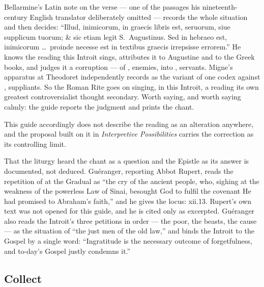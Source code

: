 \begin{witnessnote}
Bellarmine's Latin note on the verse --- one of the passages his
nineteenth-century English translator deliberately omitted --- records the
whole situation and then decides: ``Illud, inimicorum, in graecis libris est,
seruorum, siue supplicum tuorum; \& sic etiam legit S.\ Augustinus. Sed in
hebraeo est, inimicorum \dots\ proinde necesse est in textibus graecis
irrepsisse errorem.'' He knows the reading this Introit sings, attributes it to
Augustine and to the Greek books, and judges it a corruption --- of
, enemies, into , servants. Migne's apparatus at
Theodoret independently records  as the variant of one codex
against , suppliants. So the Roman Rite goes on singing, in this
Introit, a reading its own greatest controversialist thought secondary. Worth
saying, and worth saying calmly: the guide reports the judgment and prints the
chant.
\end{witnessnote}

This guide accordingly does not describe the reading
as an alteration anywhere, and the proposal built on it in \textit{Interpretive
Possibilities} carries the correction as its controlling limit.

That the liturgy heard the chant as a question and the Epistle as its answer is
documented, not deduced. Guéranger, reporting Abbot Rupert, reads the
repetition of  at the Gradual as ``the
cry of the ancient people, who, sighing at the weakness of the powerless Law of
Sinai, besought God to fulfil the covenant He had promised to Abraham's
faith,'' and he gives the locus:  xii.13. Rupert's own
text was not opened for this guide, and he is cited only as excerpted.
Guéranger also reads the Introit's three petitions in order --- the poor, the
beasts, the cause --- as the situation of ``the just men of the old law,'' and
binds the Introit to the Gospel by a single word: ``Ingratitude is the
necessary outcome of forgetfulness, and to-day's Gospel justly condemns it.''

\elementguard
\subsection*{Collect }


